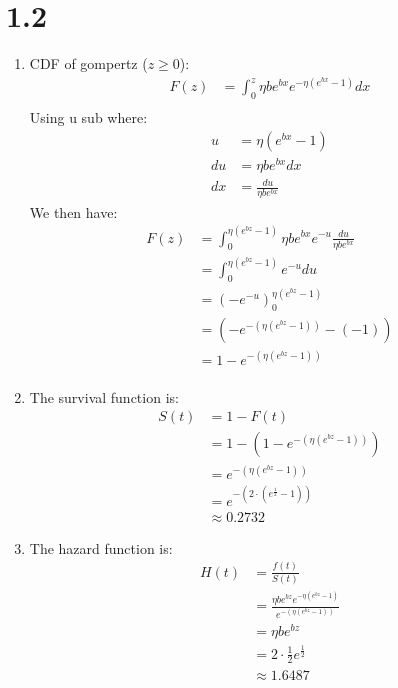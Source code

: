 \documentclass{article}
\begin{document}
\section*{1.2}
\begin{enumerate}
\item CDF of gompertz ($z \geq 0$): \\
\begin{align*}
F(z) &= \int_0^z\eta b e^{bx}e^{-\eta(e^{bx} - 1)}dx \\
\end{align*}
Using u sub where: \\
\begin{align*}
u &= \eta(e^{bx} - 1) \\
du &= \eta b e^{bx}dx \\
dx &= \frac{du}{\eta b e^{bx}} 
\end{align*}
We then have: \\
\begin{align*}
F(z) &= \int_0^{\eta(e^{bz} - 1)}\eta b e^{bx}e^{-u}\frac{du}{\eta b e^{bx}} \\
&= \int_0^{\eta(e^{bz} - 1)}e^{-u}du \\
&= (-e^{-u})_0^{\eta(e^{bz} - 1)} \\
&= (-e^{-(\eta(e^{bz} - 1))} - (-1)) \\
&= 1 - e^{-(\eta(e^{bz} - 1))} \\
\end{align*}
\item The survival function is: \\
\begin{align*}
S(t) &= 1 - F(t) \\
&= 1 -  (1 - e^{-(\eta(e^{bz} - 1))}) \\
&= e^{-(\eta(e^{bz} - 1))} \\
&= e^{-(2 \cdot (e^{\frac{1}{2}} - 1))} \\
&\approx 0.2732
\end{align*}
\item The hazard function is: \\
\begin{align*}
H(t) &= \frac{f(t)}{S(t)} \\
&= \frac{\eta b e^{bz}e^{-\eta(e^{bz} - 1)}}{e^{-(\eta(e^{bz} - 1))}} \\
&= \eta b e^{bz} \\
&= 2 \cdot \frac{1}{2} e^{\frac{1}{2}} \\
&\approx 1.6487 \\
\end{align*}
\end{enumerate}
\end{document}
